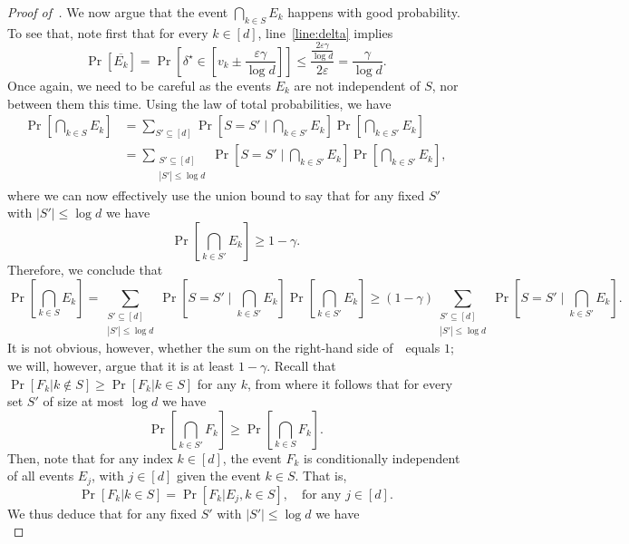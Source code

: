 \begin{proof}[Proof of~]
We now argue that the event $\bigcap_{k \in S} E_k$ happens with good probability.
To see that, note first that for every $k \in [d]$, line~\ref{line:delta} implies
\[
	\Pr[\overline{E_k}] = \Pr\left[\delta^\star \in \left[v_k \pm \frac{\varepsilon \gamma}{\log d}\right]\right] \leq \frac{\frac{2\varepsilon \gamma}{\log d}}{2\varepsilon} = \frac{\gamma}{\log d}.
\]
Once again, we need to be careful as the events $E_k$ are not independent of $S$, nor between them this time.
Using the law of total probabilities, we have 
\begin{align*}
	\Pr\left[\bigcap_{k \in S} E_k\right] &= \sum_{S' \subseteq [d]} \Pr\left[S = S'  \mid \bigcap_{k \in S'} E_k \right] \Pr\left[\bigcap_{k \in S'} E_k\right]\\
	&= \sum_{\substack{S' \subseteq [d]\\ |S'| \leq \log d}} \Pr\left[S = S' \mid \bigcap_{k \in S'} E_k\right] \Pr\left[\bigcap_{k \in S'} E_k\right],
\end{align*}
where we can now effectively use the union bound to say that for any fixed $S'$ with $|S'| \leq \log d$ we have
\[ 
	\Pr\left[\bigcap_{k \in S'} E_k \right] \geq 1 - \gamma.
\]
Therefore, we conclude that
\begin{equation}
	\Pr\left[\bigcap_{k \in S} E_k\right] =  \sum_{\substack{S' \subseteq [d]\\ |S'| \leq \log d}} \Pr\left[S = S'\mid \bigcap_{k \in S'} E_k\right] \Pr\left[\bigcap_{k \in S'} E_k\right] \geq (1-\gamma) \sum_{\substack{S' \subseteq [d]\\ |S'| \leq \log d}} \Pr\left[S = S' \mid \bigcap_{k \in S'} E_k\right]. \label{eq:align}
\end{equation}
It is not obvious, however, whether the sum on the right-hand side of~~equals $1$; we will, however, argue that it is at least $1-\gamma$. 
Recall that $\Pr[F_k | k \not\in S] \geq \Pr[F_k | k \in S]$ for any $k$, from where it follows that for every set $S'$ of size at most $\log d$ we have 
\[ 
	\Pr\left[\bigcap_{k \in S'} F_k \right] \geq \Pr\left[\bigcap_{k \in S} F_k \right].	
\]
Then, note that for any index $k \in [d]$, the event $F_k$ is conditionally independent of all events $E_{j}$, with $j \in [d]$ given the event $k \in S$. That is,
\[
	\Pr\left[F_k | k \in S\right] = \Pr\left[F_k | E_{j}, k \in S\right], \quad \text{for any } j \in [d].
\]
We thus deduce that for any fixed $S'$ with $|S'| \leq \log d$ we have
\begin{equation}\label{eq:2}

\end{equation}
\end{proof}
